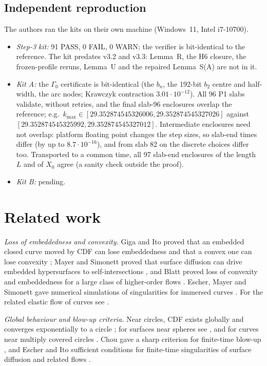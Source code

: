 \documentclass[11pt]{amsart}
\theoremstyle{definition}
\theoremstyle{remark}
\begin{document}
\subsection{Independent reproduction}\label{ss:repro}
The authors ran the kits on their own machine (Windows~11, Intel i7-10700).
\begin{itemize}[leftmargin=*,itemsep=1pt]
\item \emph{Step-3 kit:} 91 PASS, 0 FAIL, 0 WARN; the verifier is bit-identical to the reference. The kit predates v3.2 and v3.3: Lemma~R, the H6 closure, the frozen-profile reruns, Lemma~U and the repaired Lemma~S(A) are not in it.
\item \emph{Kit A:} the $\Gamma_0$ certificate is bit-identical (the $b_n$, the 192-bit $b_2$ centre and half-width, the arc nodes; Krawczyk contraction $3.01\cdot10^{-12}$). All 96 P1 slabs validate, without retries, and the final slab-96 enclosures overlap the reference; e.g.\ $k_{\max}\in[29.352874545326006,29.352874545327026]$ against $[29.352874545325992,29.352874545327012]$. Intermediate enclosures need not overlap: platform floating point changes the step sizes, so slab-end times differ (by up to $8.7\cdot10^{-16}$), and from slab 82 on the discrete choices differ too. Transported to a common time, all 97 slab-end enclosures of the length $L$ and of $X_0$ agree (a sanity check outside the proof).
\item \emph{Kit B:} pending.
\end{itemize}

\section{Related work}\label{s:rel}
\emph{Loss of embeddedness and convexity.} Giga and Ito proved that an embedded closed curve moved by CDF can lose embeddedness \cite{GigaIto1998} and that a convex one can lose convexity \cite{GigaIto1999}; Mayer and Simonett proved that surface diffusion can drive embedded hypersurfaces to self-intersections \cite{MayerSimonett2000}, and Blatt proved loss of convexity and embeddedness for a large class of higher-order flows \cite{Blatt2010}. Escher, Mayer and Simonett gave numerical simulations of singularities for immersed curves \cite{EscherMayerSimonett1998}. For the related elastic flow of curves see \cite{DziukKuwertSchatzle2002}.

\emph{Global behaviour and blow-up criteria.} Near circles, CDF exists globally \cite{ElliottGarcke1997} and converges exponentially to a circle \cite{Wheeler2013}; for surfaces near spheres see \cite{EscherMayerSimonett1998,Wheeler2012}, and for curves near multiply covered circles \cite{MiuraOkabe2021}. Chou gave a sharp criterion for finite-time blow-up \cite{Chou2003}, and Escher and Ito sufficient conditions for finite-time singularities of surface diffusion and related flows \cite{EscherIto2005}.
\end{document}
